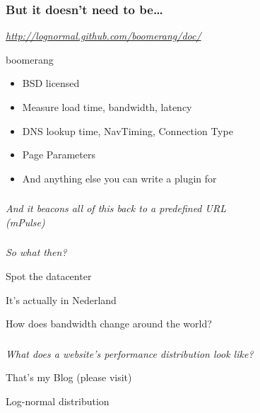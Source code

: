 \documentclass{beamer}
\newcommand{\innersplash}[1]{
  \begin{center}
    \Large \textrm{\textit{ #1 } }
  \end{center}
}
\newcommand{\splashslide}[2][{}]{
  \begin{frame}
  \frametitle{#1}
  \innersplash{#2}
  \end{frame}
}
\begin{document}
\splashslide[But it doesn't need to be\ldots]{\href{http://www.realusermeasurement.org/}{http://lognormal.github.com/boomerang/doc/}}

\begin{frame}{boomerang}
  \begin{itemize}
    \item BSD licensed
    \item Measure load time, bandwidth, latency
    \item DNS lookup time, NavTiming, Connection Type
    \item Page Parameters
    \item And anything else you can write a plugin for
  \end{itemize}
\end{frame}

\splashslide{And it beacons all of this back to a predefined URL \\ (mPulse)}

\splashslide{So what then?}

\begin{frame}{Spot the datacenter}
\end{frame}

\begin{frame}{It's actually in Nederland}
\end{frame}

\begin{frame}{How does bandwidth change around the world?}
\end{frame}


\splashslide{What does a website's performance distribution look like?}

\begin{frame}{That's my Blog (please visit)}
\end{frame}

\begin{frame}{Log-normal distribution}
\end{frame}
\end{document}
